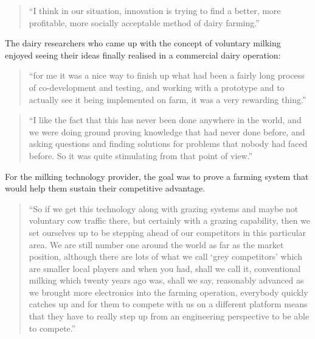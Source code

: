 \begin{quote}
\small
\enquote{I think in our situation, innovation is trying to find a better, more profitable, more socially acceptable method of dairy farming.} \\
\end{quote}

The dairy researchers who came up with the concept of voluntary milking enjoyed seeing their ideas finally realised in a commercial dairy operation:

\begin{quote}
\small
\enquote{for me it was a nice way to finish up what had been a fairly long process of co-development and testing, and working with a prototype and to actually see it being implemented on farm, it was a very rewarding thing.} \\
\end{quote}

\begin{quote}
\small
\enquote{I like the fact that this has never been done anywhere in the world, and we were doing ground proving knowledge that had never done before, and asking questions and finding solutions for problems that nobody had faced before. So it was quite stimulating from that point of view.} \\
\end{quote}

For the milking technology provider, the goal was to prove a farming system that would help them sustain their competitive advantage. 

\begin{quote}
\small
\enquote{So if we get this technology along with grazing systems and maybe not voluntary cow traffic there, but certainly with a grazing capability, then we set ourselves up to be stepping ahead of our competitors in this particular area. We are still number one around the world as far as the market position, although there are lots of what we call \enquote{grey competitors} which are smaller local players and when you had, shall we call it, conventional milking which twenty years ago was, shall we say, reasonably advanced as we brought more electronics into the farming operation, everybody quickly catches up and for them to compete with us on a different platform means that they have to really step up from an engineering perspective to be able to compete.} \\
\end{quote}

